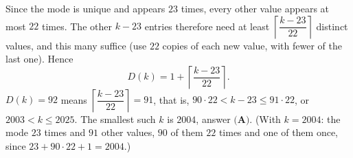 Since the mode is unique and appears $23$ times, every other value appears at most $22$ times. The other $k-23$ entries therefore need at least $\left\lceil\dfrac{k-23}{22}\right\rceil$ distinct values, and this many suffice (use $22$ copies of each new value, with fewer of the last one). Hence
\[D(k)=1+\left\lceil\dfrac{k-23}{22}\right\rceil .\]
$D(k)=92$ means $\left\lceil\dfrac{k-23}{22}\right\rceil=91$, that is, $90\cdot22<k-23\le91\cdot22$, or $2003<k\le2025$. The smallest such $k$ is $\boxed{2004}$, answer $\textbf{(A)}$. (With $k=2004$: the mode $23$ times and $91$ other values, $90$ of them $22$ times and one of them once, since $23+90\cdot22+1=2004$.)
